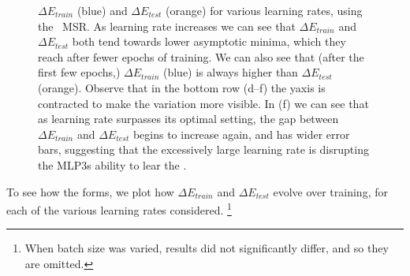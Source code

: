 \begin{figure}[t]
{        \label{fig:mlp3-trunc_err_epochs_xmin_8}
    }
    \caption{
            $\Delta E_{train}$ (blue) and $\Delta E_{test}$ (orange) for various learning rates, using the 
            \POWERLAW~MSR. As learning rate increases we can see that $\Delta E_{train}$ and $\Delta E_{test}$ both tend 
            towards lower asymptotic minima, which they reach after fewer epochs of training. We can also see that 
            (after the first few epochs,) $\Delta E_{train}$ (blue) is always higher than $\Delta E_{test}$ (orange). 
            Observe that in the bottom row (d--f) the yaxis is contracted to make the variation more visible. In (f) we can see 
            that as learning rate surpasses its optimal setting, the gap between $\Delta E_{train}$ and $\Delta 
            E_{test}$ begins to increase again, and has wider error bars, suggesting that the excessively large learning 
            rate is disrupting the MLP3s ability to lear the \EffectiveCorrelationSpace.
    }
    \label{fig:mlp3-msr-results-xmin}
\end{figure}



To see how the \EffectiveCorrelationSpace forms, we plot how $\Delta E_{train}$ and $\Delta E_{test}$ evolve over training, for each of the various learning rates considered.%
\footnote{When batch size was varied, results did not significantly differ, and so they are omitted. 
} 

